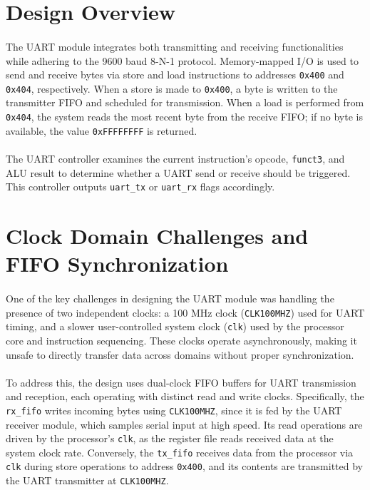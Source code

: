 \documentclass[12pt]{report}
\begin{document}
\section{Design Overview}

\paragraph{}
The UART module integrates both transmitting and receiving functionalities while adhering to the 9600 baud 8-N-1 protocol. Memory-mapped I/O is used to send and receive bytes via store and load instructions to addresses \texttt{0x400} and \texttt{0x404}, respectively. When a store is made to \texttt{0x400}, a byte is written to the transmitter FIFO and scheduled for transmission. When a load is performed from \texttt{0x404}, the system reads the most recent byte from the receive FIFO; if no byte is available, the value \texttt{0xFFFFFFFF} is returned.

\paragraph{}
The UART controller examines the current instruction's opcode, \texttt{funct3}, and ALU result to determine whether a UART send or receive should be triggered. This controller outputs \texttt{uart\_tx} or \texttt{uart\_rx} flags accordingly.

\section{Clock Domain Challenges and FIFO Synchronization}

\paragraph{}
One of the key challenges in designing the UART module was handling the presence of two independent clocks: a 100 MHz clock (\texttt{CLK100MHZ}) used for UART timing, and a slower user-controlled system clock (\texttt{clk}) used by the processor core and instruction sequencing. These clocks operate asynchronously, making it unsafe to directly transfer data across domains without proper synchronization.

\paragraph{}
To address this, the design uses dual-clock FIFO buffers for UART transmission and reception, each operating with distinct read and write clocks. Specifically, the \texttt{rx\_fifo} writes incoming bytes using \texttt{CLK100MHZ}, since it is fed by the UART receiver module, which samples serial input at high speed. Its read operations are driven by the processor's \texttt{clk}, as the register file reads received data at the system clock rate. Conversely, the \texttt{tx\_fifo} receives data from the processor via \texttt{clk} during store operations to address \texttt{0x400}, and its contents are transmitted by the UART transmitter at \texttt{CLK100MHZ}. 
\end{document}
